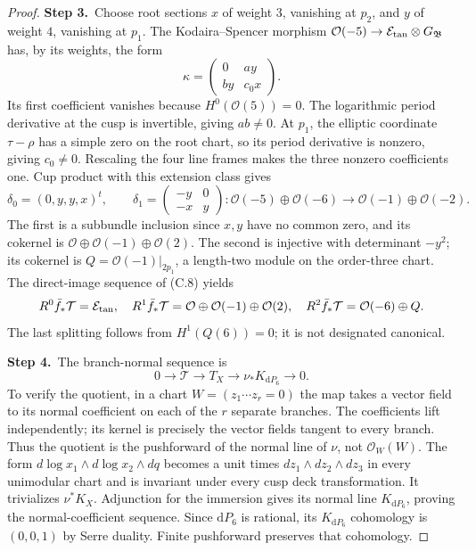 \documentclass[11pt,a4paper]{article}
\theoremstyle{plain}
\theoremstyle{definition}
\begin{document}
\begin{proof}
\par\smallskip\noindent\textbf{Step 3.}\ Choose root sections $x$ of weight $3$, vanishing at $p_2$, and $y$ of weight $4$, vanishing at $p_1$. The Kodaira--Spencer morphism $\mathcal O(-5)\to \mathcal E_{\rm tan}\otimes G_{\mathfrak B}$ has, by its weights, the form
\[
 \kappa=\begin{pmatrix}0&a y\\b y&c_0x\end{pmatrix}.
\]
Its first coefficient vanishes because $H^0(\mathcal O(5))=0$. The logarithmic period derivative at the cusp is invertible, giving $ab\ne0$. At $p_1$, the elliptic coordinate $\tau-\rho$ has a simple zero on the root chart, so its period derivative is nonzero, giving $c_0\ne0$. Rescaling the four line frames makes the three nonzero coefficients one. Cup product with this extension class gives
\[
\delta_0=(0,y,y,x)^t,\qquad
\delta_1=\begin{pmatrix}-y&0\\-x&y\end{pmatrix}:
 \mathcal O(-5)\oplus\mathcal O(-6)\to\mathcal O(-1)\oplus\mathcal O(-2).
\]
The first is a subbundle inclusion since $x,y$ have no common zero, and its cokernel is $\mathcal O\oplus\mathcal O(-1)\oplus\mathcal O(2)$. The second is injective with determinant $-y^2$; its cokernel is
$Q=\mathcal O(-1)|_{2p_1}$, a length-two module on the order-three chart. The direct-image sequence of (C.8) yields
\[
 R^0\bar f_*\mathcal T=\mathcal E_{\rm tan},\quad
 R^1\bar f_*\mathcal T=\mathcal O\oplus\mathcal O(-1)\oplus\mathcal O(2),\quad
 R^2\bar f_*\mathcal T=\mathcal O(-6)\oplus Q.
\]
The last splitting follows from $H^1(Q(6))=0$; it is not designated canonical.

\par\smallskip\noindent\textbf{Step 4.}\ The branch-normal sequence is
\[
0\longrightarrow\mathcal T\longrightarrow T_X
\longrightarrow\nu_*K_{\mathrm dP_6}\longrightarrow0.
\]
To verify the quotient, in a chart $W=(z_1\cdots z_r=0)$ the map takes
a vector field to its normal coefficient on each of the $r$ separate
branches. The coefficients lift independently; its kernel is precisely
the vector fields tangent to every branch. Thus the quotient is the
pushforward of the normal line of $\nu$, not $\mathcal O_W(W)$.
The form $d\log x_1\wedge d\log x_2\wedge dq$ becomes a unit times
$dz_1\wedge dz_2\wedge dz_3$ in every unimodular chart and is invariant
under every cusp deck transformation. It trivializes $\nu^*K_X$.
Adjunction for the immersion gives its normal line $K_{\mathrm dP_6}$, proving
the normal-coefficient sequence. Since $\mathrm dP_6$ is rational, its $K_{\mathrm dP_6}$ cohomology is $(0,0,1)$ by
Serre duality. Finite pushforward preserves that cohomology.


\end{proof}
\end{document}
